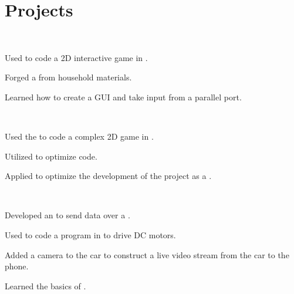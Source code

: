 \documentclass[dvipsnames]{deedy-resume-openfont}
\begin{document}
\begin{minipage}[t]{0.32\textwidth}
  \section{Projects}
  \\
 \begin{tightz}
  \item Used  to code a 2D interactive game in .
  \item Forged a  from household materials.
  \item Learned how to create a GUI and take input from a parallel port.
  \end{tightz}
  \sectionsep
  
  \\
 \begin{tightemize}
  \item Used the  to code a complex 2D game in .
  \item Utilized  to optimize code. 
  \item Applied  to optimize the development of the project as a .
  \end{tightemize}
  \sectionsep
  
  \\
  \begin{tightemize}
    \item Developed an  to send data over a .
  	\item Used  to code a program in  to drive DC motors.
    \item Added a camera to the car to construct a live video stream from the car to the phone.
    \item Learned the basics of .
  \end{tightemize}
  \sectionsep
  


\end{minipage}
\end{document}
